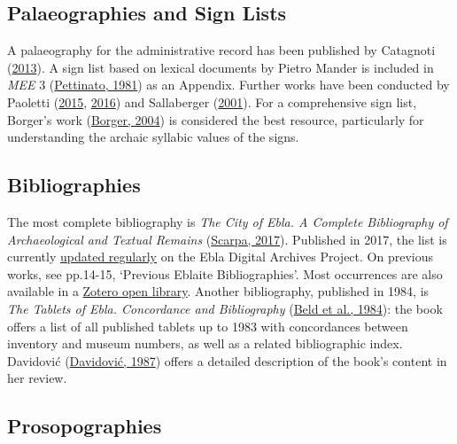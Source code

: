 \documentclass[
]{book}
\begin{document}
\hypertarget{palaeographies-and-sign-lists}{%
\subsection{Palaeographies and Sign Lists}\label{palaeographies-and-sign-lists}}

A palaeography for the administrative record has been published by Catagnoti (\protect\hyperlink{ref-Catagnoti2013a}{2013}). A sign list based on lexical documents by Pietro Mander is included in \emph{MEE} 3 (\protect\hyperlink{ref-Pettinato1981a}{Pettinato, 1981}) as an Appendix. Further works have been conducted by Paoletti (\protect\hyperlink{ref-Paoletti2015}{2015}, \protect\hyperlink{ref-Paoletti2016}{2016}) and Sallaberger (\protect\hyperlink{ref-Sallaberger2001}{2001}). For a comprehensive sign list, Borger's work (\protect\hyperlink{ref-Borger2004}{Borger, 2004}) is considered the best resource, particularly for understanding the archaic syllabic values of the signs.

\hypertarget{bibliographies}{%
\subsection{Bibliographies}\label{bibliographies}}

The most complete bibliography is \emph{The City of Ebla. A Complete Bibliography of Archaeological and Textual Remains} (\protect\hyperlink{ref-Scarpa2017a}{Scarpa, 2017}). Published in 2017, the list is currently \href{http://ebda.cnr.it/biblio}{updated regularly} on the Ebla Digital Archives Project. On previous works, see pp.14-15, `Previous Eblaite Bibliographies'. Most occurrences are also available in a \href{https://www.zotero.org/groups/1079694/the-city-of-ebla/library}{Zotero open library}.
Another bibliography, published in 1984, is \emph{The Tablets of Ebla. Concordance and Bibliography} (\protect\hyperlink{ref-BeldEtAl1984}{Beld et al., 1984}): the book offers a list of all published tablets up to 1983 with concordances between inventory and museum numbers, as well as a related bibliographic index. Davidović (\protect\hyperlink{ref-Davidovic1987}{Davidović, 1987}) offers a detailed description of the book's content in her review.

\hypertarget{prosopographies}{%
\subsection{Prosopographies}\label{prosopographies}}
\end{document}
